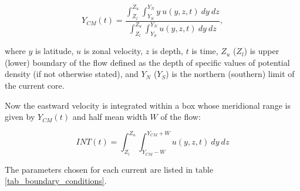 \documentclass[os, manuscript]{copernicus}
\begin{document}
	\begin{equation}
		Y_{CM}(t) = \frac{\int_{Z_l}^{Z_u} \int_{Y_{S}}^{Y_{N}} y\ u(y,z,t)\ dy\ dz}{\int_{Z_l}^{Z_u} \int_{Y_{S}}^{Y_{N}} u(y,z,t)\ dy\ dz},
		\label{equ_Y_CM}
	\end{equation}
	
	where $y$ is latitude,  $u$ is zonal velocity, $z$ is depth, $t$ is time, $Z_u$ ($Z_l$) is upper (lower) boundary of the flow defined as the depth of specific values of potential density (if not otherwise stated), and $Y_N$ ($Y_S$) is the northern (southern) limit of the current core.
	
	Now the eastward velocity is integrated within a box whose meridional range is given by $ Y_{CM}(t) $ and half mean width $ W $ of the flow:
	
	\begin{equation}
		INT(t) = \int_{Z_l}^{Z_u} \int_{Y_{CM}-W}^{Y_{CM}+W} u(y,z,t)\ dy\ dz 
		\label{equ_INT}
	\end{equation}
	
	The parameters chosen for each current are listed in table \ref{tab_boundary_conditions}.
	
\end{document}
